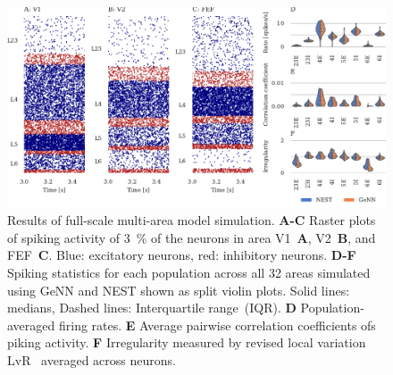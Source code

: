 \documentclass[9pt,twocolumn,twoside,lineno]{pnas-new}
\begin{document}
\begin{figure}
    \centering
    \includegraphics{figures/multi_area}
    \caption{Results of full-scale multi-area model simulation. 
    \textbf{A-C} Raster plots of spiking activity of \SI{3}{\percent} of the neurons in area V1~\textbf{A}, V2~\textbf{B}, and FEF~\textbf{C}. 
    Blue: excitatory neurons, red: inhibitory neurons.
    \textbf{D-F} Spiking statistics for each population across all 32 areas simulated using GeNN and NEST shown as split violin plots.
    Solid lines: medians, Dashed lines: Interquartile range~(IQR).
    \textbf{D} Population-averaged firing rates.
    \textbf{E} Average pairwise correlation coefficients ofs piking activity. 
    \textbf{F} Irregularity measured by revised local variation LvR~\citep{Shinomoto2009} averaged across neurons.}
    \label{fig:multi_area}
\end{figure}
%
\end{document}
